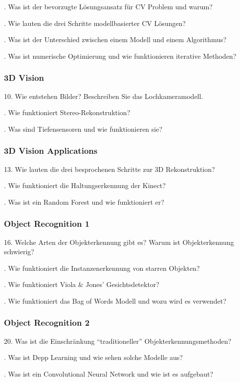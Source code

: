\documentclass[paper=A4,11pt]{scrartcl}
\begin{document}
\bigskip{}. Was ist der bevorzugte Lösungsansatz für CV Problem und warum?

\bigskip{}. Wie lauten die drei Schritte modellbasierter CV Lösungen?

\bigskip{}. Was ist der Unterschied zwischen einem Modell und einem Algorithmus?

\bigskip{}. Was ist numerische Optimierung und wie funktionieren iterative Methoden?


\subsubsection*{3D Vision} %

10. Wie entstehen Bilder? Beschreiben Sie das Lochkameramodell.

\bigskip{}. Wie funktioniert Stereo-Rekonstruktion?

\bigskip{}. Was sind Tiefensensoren und wie funktionieren sie?


\subsubsection*{3D Vision Applications} %

13. Wie lauten die drei besprochenen Schritte zur 3D Rekonstruktion?

\bigskip{}. Wie funktioniert die Haltungserkennung der Kinect?

\bigskip{}. Was ist ein Random Forest und wie funktioniert er?


\subsubsection*{Object Recognition 1} %

16. Welche Arten der Objekterkennung gibt es? Warum ist Objekterkennung schwierig?

\bigskip{}. Wie funktioniert die Instanzenerkennung von starren Objekten?

\bigskip{}. Wie funktioniert Viola \& Jones' Gesichtsdetektor?

\bigskip{}. Wie funktioniert das Bag of Words Modell und wozu wird es verwendet?


\subsubsection*{Object Recognition 2} %

20. Was ist die Einschränkung \enquote{traditioneller} Objekterkennungsmethoden?

\bigskip{}. Was ist Depp Learning und wie sehen solche Modelle aus?

\bigskip{}. Was ist ein Convolutional Neural Network und wie ist es aufgebaut?


\printbibliography
\end{document}
